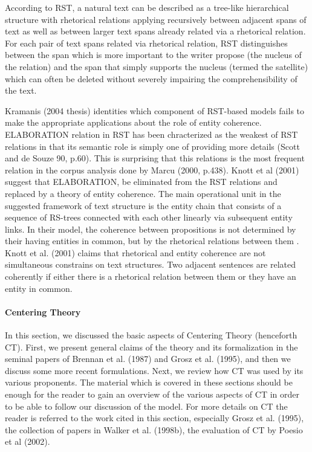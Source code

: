 According to RST, a natural text can be described as a tree-like hierarchical structure with rhetorical relations applying recursively between adjacent spans of text as well as between larger text spans already related via a rhetorical relation. For each pair of text spans related via rhetorical relation, RST distinguishes between the span which is more important to the writer propose (the nucleus of the relation) and the span that simply supports the nucleus (termed the satellite) which can often be deleted without severely impairing the comprehensibility of the text. 

Kramanis (2004 thesis) identities which component of RST-based models fails to make the appropriate applications about the role of entity coherence.
ELABORATION relation in RST has been chracterized as the weakest of RST relations in that its semantic role is simply one of providing more details (Scott and de Souze 90, p.60). 
This is surprising that this relations is the most frequent relation in the corpus analysis done by Marcu (2000, p.438). 
Knott et al (2001) suggest that ELABORATION, be eliminated from the RST relations and replaced by a theory of entity coherence. 
The main operational unit in the suggested framework of text structure is the entity chain that consists of a sequence of RS-trees connected with each other linearly via subsequent entity links. 
In their model, the coherence between propositions is not determined by their having entities in common, but by the rhetorical relations between them . 
Knott et al. (2001) claims that rhetorical and entity coherence are not simultaneous constrains on text structures. Two adjacent sentences are related coherently if either there is a rhetorical relation between them or they have an entity in common. 

\paragraph{Centering Theory}
In this section, we discussed the basic aspects of Centering Theory (henceforth CT). 
First, we present general claims of the theory and its formalization in the seminal papers of Brennan et al. (1987) and Grosz et al. (1995), and then we discuss some more recent formulations. 
Next, we review how CT was used by its various proponents. 
The material which is covered in these sections should be enough for the reader to gain an overview of the various aspects of CT in order to be able to follow our discussion of the model. 
For more details on CT the reader is referred to the work cited in this section, especially Grosz et al. (1995), the collection of papers in Walker et al. (1998b), the evaluation of CT by Poesio et al (2002). 

